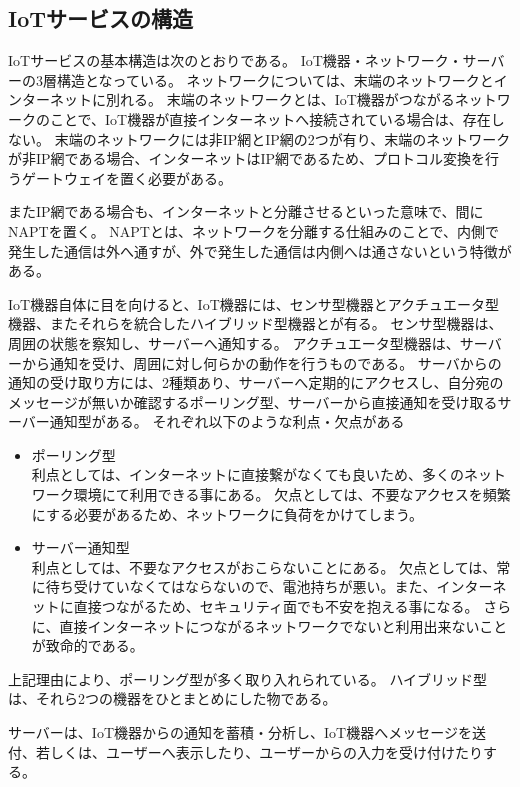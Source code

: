 \subsection{IoTサービスの構造}
IoTサービスの基本構造は次のとおりである。
IoT機器・ネットワーク・サーバーの3層構造となっている。
ネットワークについては、末端のネットワークとインターネットに別れる。
末端のネットワークとは、IoT機器がつながるネットワークのことで、IoT機器が直接インターネットへ接続されている場合は、存在しない。
末端のネットワークには非IP網とIP網の2つが有り、末端のネットワークが非IP網である場合、インターネットはIP網であるため、プロトコル変換を行うゲートウェイを置く必要がある。

またIP網である場合も、インターネットと分離させるといった意味で、間にNAPTを置く。
NAPTとは、ネットワークを分離する仕組みのことで、内側で発生した通信は外へ通すが、外で発生した通信は内側へは通さないという特徴がある。

IoT機器自体に目を向けると、IoT機器には、センサ型機器とアクチュエータ型機器、またそれらを統合したハイブリッド型機器とが有る。
センサ型機器は、周囲の状態を察知し、サーバーへ通知する。
アクチュエータ型機器は、サーバーから通知を受け、周囲に対し何らかの動作を行うものである。
サーバからの通知の受け取り方には、2種類あり、サーバーへ定期的にアクセスし、自分宛のメッセージが無いか確認するポーリング型、サーバーから直接通知を受け取るサーバー通知型がある。
それぞれ以下のような利点・欠点がある
\begin{itemize}
	\item ポーリング型\\
		利点としては、インターネットに直接繋がなくても良いため、多くのネットワーク環境にて利用できる事にある。
		欠点としては、不要なアクセスを頻繁にする必要があるため、ネットワークに負荷をかけてしまう。
	\item サーバー通知型\\
		利点としては、不要なアクセスがおこらないことにある。
		欠点としては、常に待ち受けていなくてはならないので、電池持ちが悪い。また、インターネットに直接つながるため、セキュリティ面でも不安を抱える事になる。
		さらに、直接インターネットにつながるネットワークでないと利用出来ないことが致命的である。
\end{itemize}
上記理由により、ポーリング型が多く取り入れられている。
ハイブリッド型は、それら2つの機器をひとまとめにした物である。

サーバーは、IoT機器からの通知を蓄積・分析し、IoT機器へメッセージを送付、若しくは、ユーザーへ表示したり、ユーザーからの入力を受け付けたりする。


